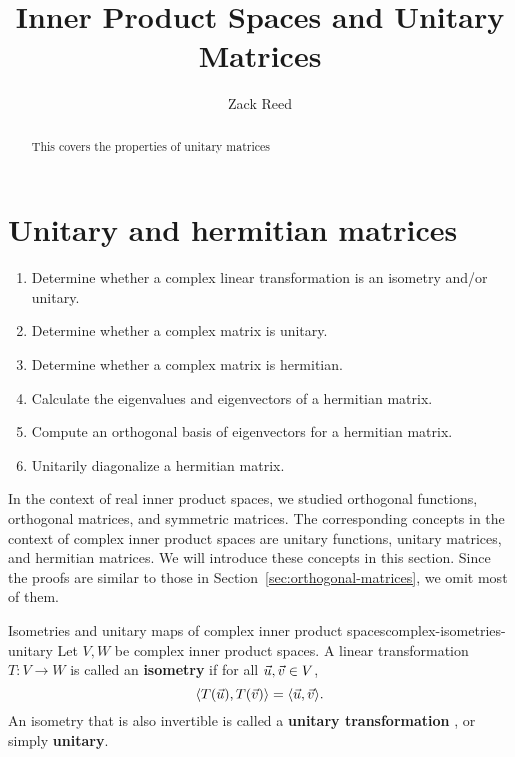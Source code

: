 \documentclass{ximera}
\author{Zack Reed}
\title{Inner Product Spaces and Unitary Matrices}
\begin{document}
\begin{abstract}

    This covers the properties of unitary matrices

\end{abstract}
\maketitle



\section{Unitary and hermitian matrices}

  \begin{enumerate}
  \item Determine whether a complex linear transformation is an
    isometry and/or unitary.
  \item Determine whether a complex matrix is unitary.
  \item Determine whether a complex matrix is hermitian.
  \item Calculate the eigenvalues and eigenvectors of a hermitian
    matrix.
  \item Compute an orthogonal basis of eigenvectors for a hermitian
    matrix.
  \item Unitarily diagonalize a hermitian matrix. 
  \end{enumerate}

In the context of real inner product spaces, we studied orthogonal
functions, orthogonal matrices, and symmetric matrices. The
corresponding concepts in the context of complex inner product spaces
are unitary functions, unitary matrices, and hermitian matrices. We
will introduce these concepts in this section. Since the proofs are
similar to those in Section~\ref{sec:orthogonal-matrices}, we omit
most of them.

\begin{definition}{Isometries and unitary maps of complex inner product spaces}{complex-isometries-unitary}
  Let $V,W$ be complex inner product spaces. A linear transformation
  $T:V\to W$ is called an \textbf{isometry}%
   if for all
  $\vec{u},\vec{v}\in V$,
  \begin{equation*}
    \langle T(\vec{u}),T(\vec{v}) \rangle = \langle \vec{u},\vec{v} \rangle.
  \end{equation*}
  An isometry that is also invertible is called a \textbf{unitary
    transformation}%
  , or simply \textbf{unitary}.
\end{definition}
\end{document}
